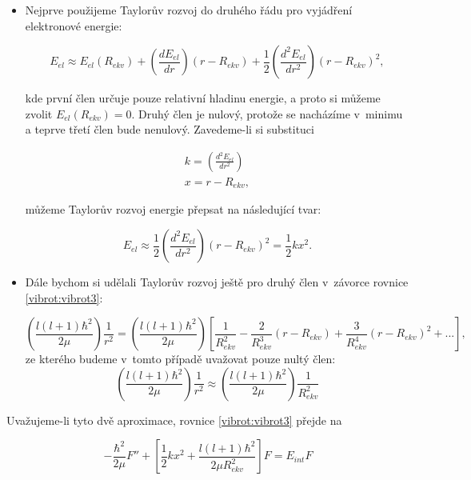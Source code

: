 \begin{itemize}

\item Nejprve použijeme Taylorův rozvoj do druhého řádu pro vyjádření elektronové energie:

\begin{equation}
E_{el}\approx E_{el}(R_{ekv})+\left(\frac{dE_{el}}{dr}\right)(r-R_{ekv})+\frac{1}{2}\left(\frac{d^2E_{el}}{dr^2}\right)(r-R_{ekv})^2, 
\end{equation}

\noindent kde první člen určuje pouze relativní hladinu energie, a proto si můžeme zvolit $E_{el}(R_{ekv})=0$. Druhý člen je nulový, protože se nacházíme v~minimu a teprve třetí člen bude nenulový. Zavedeme-li si substituci

\begin{eqnarray}
k=\left(\frac{d^2E_{el}}{dr^2}\right)\nonumber \\
x=r-R_{ekv}\nonumber,
\end{eqnarray}

\noindent můžeme Taylorův rozvoj energie přepsat na následující tvar:

\begin{equation}
E_{el}\approx\frac{1}{2}\left(\frac{d^2E_{el}}{dr^2}\right)(r-R_{ekv})^2=\frac{1}{2}kx^2.
\end{equation}

\item Dále bychom si udělali Taylorův rozvoj ještě pro druhý člen v~závorce rovnice \ref{vibrot:vibrot3}:

\begin{equation}
\left(\frac{l\left(l+1\right)\hbar^2}{2\mu}\right)\frac{1}{r^2} =
\left(\frac{l\left(l+1\right)\hbar^2}{2\mu}\right)
\left[\frac{1}{R_{ekv}^2}
-\frac{2}{R_{ekv}^3}(r-R_{ekv})
+\frac{3}{R_{ekv}^4}(r-R_{ekv})^2+...
\right],
\end{equation}
ze kterého budeme v~tomto případě uvažovat pouze nultý člen:
\begin{equation}
\left(\frac{l\left(l+1\right)\hbar^2}{2\mu}\right)\frac{1}{r^2} \approx \left(\frac{l\left(l+1\right)\hbar^2}{2\mu}\right)\frac{1}{R_{ekv}^2}
\end{equation}
\end{itemize}

Uvažujeme-li tyto dvě aproximace, rovnice \ref{vibrot:vibrot3} přejde na 

\begin{equation}
-\frac{\hbar^2}{2\mu}F''+\left[\frac{1}{2}kx^2+\frac{l\left(l+1\right)\hbar^2}{2\mu R_{ekv}^2}\right]F=E_{int}F 
\label{vibrot:vibrot4}
\end{equation}

